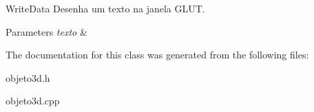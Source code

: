 Write\+Data Desenha um texto na janela G\+L\+U\+T. 


\begin{DoxyParams}{Parameters}
{\em texto} & \\
\hline
\end{DoxyParams}


The documentation for this class was generated from the following files\+:\begin{DoxyCompactItemize}
\item 
objeto3d.\+h\item 
objeto3d.\+cpp\end{DoxyCompactItemize}
